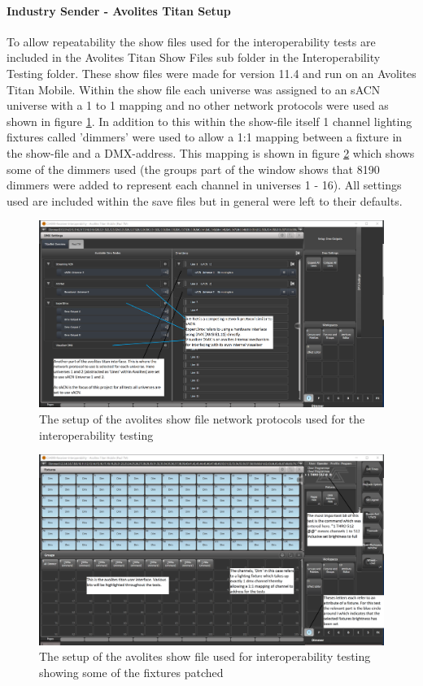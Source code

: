 \documentclass[11pt,a4paper]{report}
\begin{document}
\paragraph*{Industry Sender - Avolites Titan Setup}
To allow repeatability the show files used for the interoperability tests are included in the Avolites Titan Show Files sub folder in the Interoperability Testing folder. These show files were made for version 11.4 and run on an Avolites Titan Mobile. Within the show file each universe was assigned to an sACN universe with a 1 to 1 mapping and no other network protocols were used as shown in figure \ref{AVO_DMX_LINES}.  In addition to this within the show-file itself 1 channel lighting fixtures called 'dimmers' were used to allow a 1:1 mapping between a fixture in the show-file and a DMX-address. This mapping is shown in figure \ref{AVO_RECV_INTEROP_SETUP} which shows some of the dimmers used (the groups part of the window shows that 8190 dimmers were added to represent each channel in universes 1 - 16). All settings used are included within the save files but in general were left to their defaults.

\begin{figure}[H]
	\label{AVO_DMX_LINES}
	\includegraphics*[width=\textwidth]{avo-dmx-lines.png}
	\caption{The setup of the avolites show file network protocols used for the interoperability testing}
\end{figure}

\begin{figure}[H]
	\label{AVO_RECV_INTEROP_SETUP}
	\includegraphics*[width=\textwidth]{avo-file-dims.png}
	\caption{The setup of the avolites show file used for interoperability testing showing some of the fixtures patched}
\end{figure}
\end{document}
